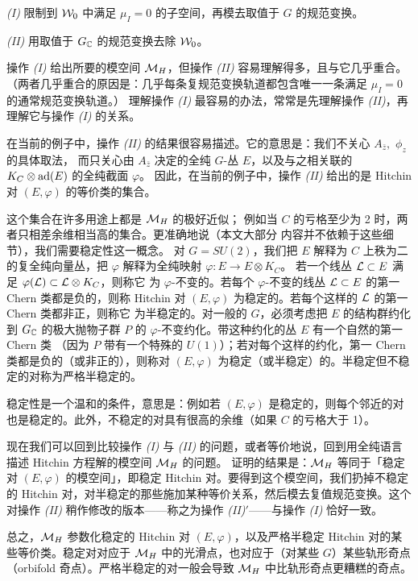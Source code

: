 \emph{(I)} 限制到 $\EUW_0$ 中满足 $\mu_I=0$ 的子空间，再模去取值于 $G$ 的规范变换。

\emph{(II)} 用取值于 $G_{\Bbb{C}}$ 的规范变换去除 $\EUW_0$。

操作 \emph{(I)} 给出所要的模空间
$\MH$，但操作 \emph{(II)} 容易理解得多，且与它几乎重合。
（两者几乎重合的原因是：几乎每条复规范变换轨道都包含唯一一条满足 $\mu_I=0$ 的通常规范变换轨道。）
理解操作 \emph{(I)} 最容易的办法，常常是先理解操作 \emph{(II)}，再理解它与操作 \emph{(I)} 的关系。

在当前的例子中，操作 \emph{(II)} 的结果很容易描述。它的意思是：我们不关心 $A_{\bar z}, $ $\phi_z$ 的具体取法，
而只关心由 $A_{\bar z}$ 决定的全纯 $G$-丛 $E$，以及与之相关联的
$K_C\otimes {\ad}(E)$ 的全纯截面 $\varphi$。
因此，在当前的例子中，操作 \emph{(II)} 给出的是 Hitchin 对 $(E,\varphi)$ 的等价类的集合。

这个集合在许多用途上都是 $\MH$ 的极好近似；
例如当 $C$ 的亏格至少为 2 时，两者只相差余维相当高的集合。更准确地说（本文大部分
内容并不依赖于这些细节），我们需要稳定性这一概念。
对 $G=SU(2)$，我们把 $E$ 解释为 $C$ 上秩为二的复全纯向量丛，把 $\varphi$ 解释为全纯映射 $\varphi:E\to E\otimes K_C$。
若一个线丛 ${\cal L}\subset E$ 满足 $\varphi({\cal L})\subset {\cal L}\otimes K_C$，则称它
为 $\varphi$-不变的。若每个 $\varphi$-不变的线丛 ${\cal L}\subset E$ 的第一 Chern 类都是负的，则称
Hitchin 对 $(E,\varphi)$ 为稳定的。若每个这样的 ${\cal L}$ 的第一 Chern 类都非正，则称它
为半稳定的。对一般的 $G$，必须考虑把 $E$ 的结构群约化到 $G_{\Bbb{C}}$ 的极大抛物子群 $P$ 的 $\varphi$-不变约化。带这种约化的丛 $E$ 有一个自然的第一 Chern 类
（因为 $P$ 带有一个特殊的 $U(1)$）；若对每个这样的约化，第一 Chern 类都是负的（或非正的），则称对
$(E,\varphi)$ 为稳定（或半稳定）的。半稳定但不稳定的对称为严格半稳定的。

稳定性是一个温和的条件，意思是：例如若
$(E,\varphi)$ 是稳定的，则每个邻近的对也是稳定的。此外，不稳定的对具有很高的余维（如果 $C$ 的亏格大于 1）。

现在我们可以回到比较操作 \emph{(I)} 与 \emph{(II)} 的问题，或者等价地说，回到用全纯语言描述 Hitchin 方程解的模空间 $\MH$ 的问题。
\cite{ref20} 证明的结果是：$\MH$ 等同于「稳定对 $(E,\varphi)$ 的模空间」，即稳定 Hitchin 对。要得到这个模空间，我们扔掉不稳定的 Hitchin 对，对半稳定的那些施加某种等价关系，然后模去复值规范变换。这个对操作 \emph{(II)} 稍作修改的版本——称之为操作 \emph{(II)$'$}——与操作 \emph{(I)} 恰好一致。

总之，$\MH$ 参数化稳定的 Hitchin 对 $(E,\varphi)$，以及严格半稳定 Hitchin 对的某些等价类。稳定对对应于 $\MH$ 中的光滑点，也对应于（对某些 $G$）某些轨形奇点（orbifold 奇点）。严格半稳定的对一般会导致 $\MH$ 中比轨形奇点更糟糕的奇点。

